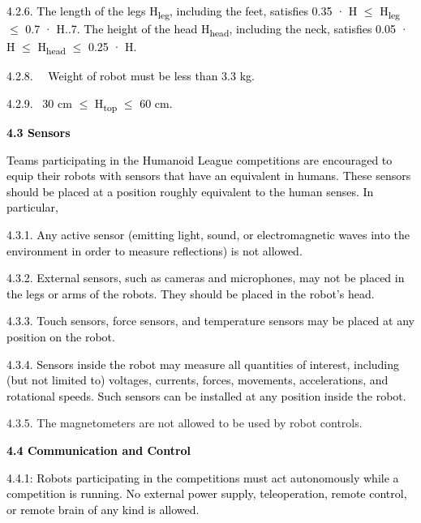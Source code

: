 \documentclass[a4paper]{article}
\begin{document}
\textcolor{black}{4.2.6. The length of the legs H}\textcolor{black}{\textsubscript{leg}}\textcolor{black}{, including
the feet, satisfies 0.35 · H ${\leq}$ H}\textcolor{black}{\textsubscript{leg }}\textcolor{black}{${\leq}$
0.7 · H..7. The height of the head H}\textcolor{black}{\textsubscript{head}}\textcolor{black}{, including the neck,
satisfies 0.05 · H ${\leq}$ H}\textcolor{black}{\textsubscript{head }}\textcolor{black}{${\leq}$
0.25 · H.}

\textcolor{black}{4.2.8. \ \ Weight of robot must be less than 3.3 kg. }

\textcolor{black}{4.2.9. \ 30 cm ${\leq}$ H\textsubscript{top } ${\leq}$ 60 cm.}

\textbf{\textcolor{black}{4.3 Sensors}}

\textcolor{black}{Teams participating in the Humanoid League competitions are encouraged to equip their robots with
sensors that have an equivalent in humans. These sensors should be placed at a position roughly equivalent to the human
senses. In particular,}

\textcolor{black}{4.3.1. Any active sensor (emitting light, sound, or electromagnetic waves into the environment in
order to measure reflections) is not allowed.}

\textcolor{black}{4.3.2. External sensors, such as cameras and microphones, may not be placed in the legs or arms of the
robots. They should be placed in the robot's head.}

\textcolor{black}{4.3.3. Touch sensors, force sensors, and temperature sensors may be placed at any position on the
robot.}

\textcolor{black}{4.3.4. Sensors inside the robot may measure all quantities of interest, including (but not limited to)
voltages, currents, forces, movements, accelerations, and rotational speeds. Such sensors can be installed at any
position inside the robot.}

4.3.5. The magnetometers are not allowed to be used by robot controls. 


\bigskip

\textbf{\textcolor{black}{4.4 Communication and Control}}


\bigskip

\textcolor{black}{4.4.1: Robots participating in the competitions must act autonomously while a competition is running.
No external power supply, teleoperation, remote control, or remote brain of any kind is allowed.}
\end{document}
